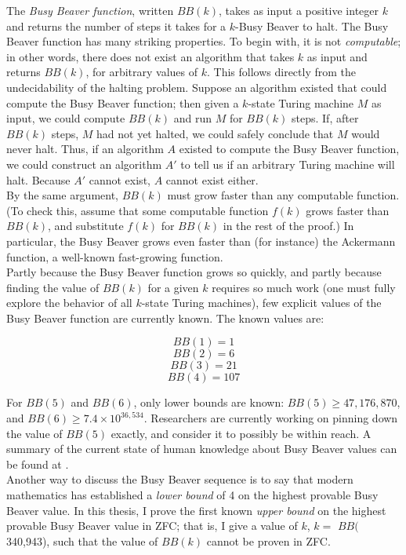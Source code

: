 \documentclass[11pt]{report}
\newcommand{\bbstatenumcomma}{$BB($340,943), }
\begin{document}
The \emph{Busy Beaver function}, written $BB(k)$, takes as input a positive integer $k$ and returns the number of steps it takes for a $k$-Busy Beaver to halt. The Busy Beaver function has many striking properties. To begin with, it is not \emph{computable}; in other words, there does not exist an algorithm that takes $k$ as input and returns $BB(k)$, for arbitrary values of $k$. This follows directly from the undecidability of the halting problem. Suppose an algorithm existed that could compute the Busy Beaver function; then given a $k$-state Turing machine $M$ as input, we could compute $BB(k)$ and run $M$ for $BB(k)$ steps. If, after $BB(k)$ steps, $M$ had not yet halted, we could safely conclude that $M$ would never halt. Thus, if an algorithm $A$ existed to compute the Busy Beaver function, we could construct an algorithm $A'$ to tell us if an arbitrary Turing machine will halt. Because $A'$ cannot exist, $A$ cannot exist either. \\

By the same argument, $BB(k)$ must grow faster than any computable function. (To check this, assume that some computable function $f(k)$ grows faster than $BB(k)$, and substitute $f(k)$ for $BB(k)$ in the rest of the proof.) In particular, the Busy Beaver grows even faster than (for instance) the Ackermann function, a well-known fast-growing function. \\

Partly because the Busy Beaver function grows so quickly, and partly because finding the value of $BB(k)$ for a given $k$ requires so much work (one must fully explore the behavior of all $k$-state Turing machines), few explicit values of the Busy Beaver function are currently known. The known values are: 

$$BB(1) = 1$$
$$BB(2) = 6$$
$$BB(3) = 21$$
$$BB(4) = 107$$

For $BB(5)$ and $BB(6)$, only lower bounds are known: $BB(5) \ge 47,176,870$, and $BB(6) \ge 7.4 \times 10^{36,534}$. Researchers are currently working on pinning down the value of $BB(5)$ exactly, and consider it to possibly be within reach. A summary of the current state of human knowledge about Busy Beaver values can be found at \cite{bbvalues}.\\


Another way to discuss the Busy Beaver sequence is to say that modern mathematics has established a \emph{lower bound} of 4 on the highest provable Busy Beaver value. In this thesis, I prove the first known \emph{upper bound} on the highest provable Busy Beaver value in ZFC; that is, I give a value of $k$, $k=$ \bbstatenumcomma such that the value of $BB(k)$ cannot be proven in ZFC. \\
\end{document}
